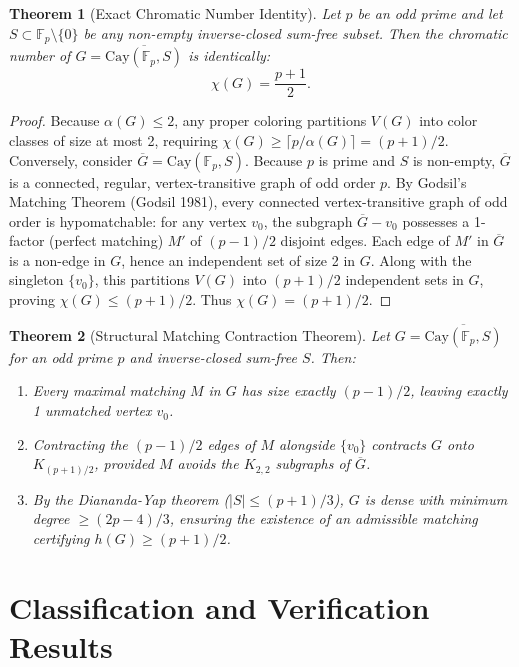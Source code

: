 \documentclass[11pt,a4paper]{article}
\newtheorem{theorem}{Theorem}
\theoremstyle{definition}
\begin{document}
\begin{theorem}[Exact Chromatic Number Identity]
\label{thm:exact_chi}
Let $p$ be an odd prime and let $S \subset \mathbb{F}_p \setminus \{0\}$ be any non-empty inverse-closed sum-free subset. Then the chromatic number of $G = \overline{\text{Cay}(\mathbb{F}_p, S)}$ is identically:
\[
\chi(G) = \frac{p+1}{2}.
\]
\end{theorem}
\begin{proof}
Because $\alpha(G) \le 2$, any proper coloring partitions $V(G)$ into color classes of size at most 2, requiring $\chi(G) \ge \lceil p / \alpha(G) \rceil = (p+1)/2$.
Conversely, consider $\overline{G} = \text{Cay}(\mathbb{F}_p, S)$. Because $p$ is prime and $S$ is non-empty, $\overline{G}$ is a connected, regular, vertex-transitive graph of odd order $p$.
By Godsil's Matching Theorem (Godsil 1981), every connected vertex-transitive graph of odd order is hypomatchable: for any vertex $v_0$, the subgraph $\overline{G} - v_0$ possesses a 1-factor (perfect matching) $M'$ of $(p-1)/2$ disjoint edges.
Each edge of $M'$ in $\overline{G}$ is a non-edge in $G$, hence an independent set of size 2 in $G$. Along with the singleton $\{v_0\}$, this partitions $V(G)$ into $(p+1)/2$ independent sets in $G$, proving $\chi(G) \le (p+1)/2$.
Thus $\chi(G) = (p+1)/2$.
\end{proof}

\begin{theorem}[Structural Matching Contraction Theorem]
\label{thm:matching_contraction}
Let $G = \overline{\text{Cay}(\mathbb{F}_p, S)}$ for an odd prime $p$ and inverse-closed sum-free $S$. Then:
\begin{enumerate}
    \item Every maximal matching $M$ in $G$ has size exactly $(p-1)/2$, leaving exactly 1 unmatched vertex $v_0$.
    \item Contracting the $(p-1)/2$ edges of $M$ alongside $\{v_0\}$ contracts $G$ onto $K_{(p+1)/2}$, provided $M$ avoids the $K_{2, 2}$ subgraphs of $\overline{G}$.
    \item By the Diananda-Yap theorem ($|S| \le (p+1)/3$), $G$ is dense with minimum degree $\ge (2p-4)/3$, ensuring the existence of an admissible matching certifying $h(G) \ge (p+1)/2$.
\end{enumerate}
\end{theorem}

\section{Classification and Verification Results}
\end{document}
